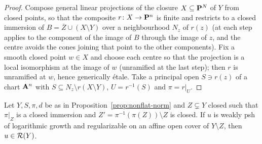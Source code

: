 \begin{proof}
Compose general linear projections of the closure $X\subseteq\mathbf{P}^N$ of $Y$ from closed points, so that
the composite $r\colon X\to\mathbf{P}^n$ is finite and restricts to a closed immersion of
$B=\overline Z\cup(X\setminus Y)$ over a neighbourhood $N_z$ of $r(z)$ (at each step
\cite[Tag~0B1Q]{Stacks} applies to the component of the image of $B$ through the image of $z$, and
the centre avoids the cones joining that point to the other components). Fix a smooth closed point
$w\in X$ and choose each centre so that the projection is a local isomorphism at the image of $w$
(unramified at the last step); then $r$ is unramified at $w$, hence generically \'etale. Take a
principal open $S\ni r(z)$ of a chart $\mathbf{A}^n$ with $S\subseteq N_z\setminus r(X\setminus Y)$,
$U=r^{-1}(S)$ and $\pi=r|_U$.
\end{proof}

\begin{proposition}\label{prop:projection-step}
Let $Y,S,\pi,d$ be as in Proposition~\ref{prop:nonflat-norm} and $Z\subsetneq Y$ closed such that
$\pi|_Z$ is a closed immersion and $Z'=\pi^{-1}(\pi(Z))\setminus Z$ is closed. If $u$ is weakly psh
of logarithmic growth and regularizable on an affine open cover of $Y\setminus Z$, then
$u\in\mathcal{R}(Y)$.
\end{proposition}

